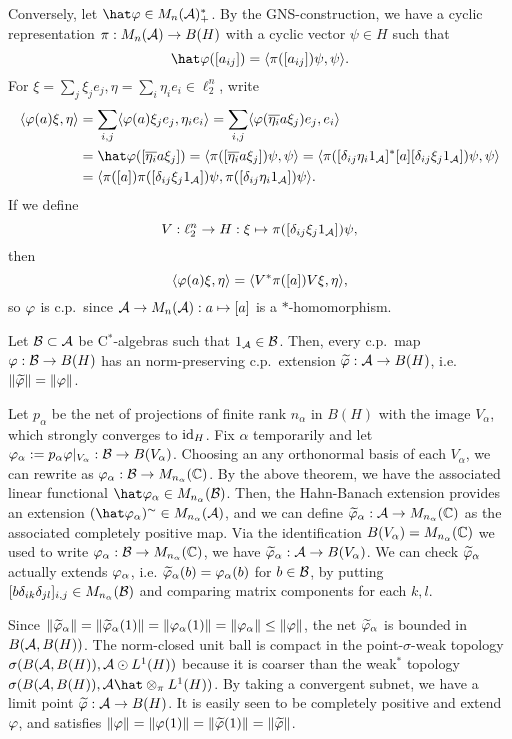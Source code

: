 \documentclass{../../small}
\begin{document}
\begin{pf}
Conversely, let $\hat\f\in M_n(\cA)^*_+$.
By the GNS-construction, we have a cyclic representation $\pi:M_n(\mathcal{A})\to B(H)$ with a cyclic vector $\psi\in H$ such that
\[\hat\f([a_{ij}])=\<\pi([a_{ij}])\psi,\psi\>.\]
For $\xi=\sum_j\xi_je_j,\eta=\sum_i\eta_ie_i\in\ell_2^n$, write
\begin{align*}
\<\f(a)\xi,\eta\>
&=\sum_{i,j}\<\f(a)\xi_je_j,\eta_ie_i\>
=\sum_{i,j}\<\f(\bar{\eta_i}a\xi_j)e_j,e_i\>\\
&=\hat\f([\bar{\eta_i}a\xi_j])
=\<\pi([\bar{\eta_i}a\xi_j])\psi,\psi\>
=\<\pi([\delta_{ij}\eta_i1_\cA]^*[a][\delta_{ij}\xi_j1_\cA])\psi,\psi\>\\
&=\<\pi([a])\pi([\delta_{ij}\xi_j1_\cA])\psi,\pi([\delta_{ij}\eta_i1_\cA])\psi\>.
\end{align*}
If we define
\[V:\ell_2^n\to H:\xi\mapsto\pi([\delta_{ij}\xi_j1_{\mathcal{A}}])\psi,\]
then
\[\langle\varphi(a)\xi,\eta\rangle=\langle V^*\pi([a])V\xi,\eta\rangle,\]
so $\varphi$ is c.p.~since $\mathcal{A}\to M_n(\mathcal{A}):a\mapsto[a]$ is a $*$-homomorphism.
\end{pf}

\begin{thm}
Let $\mathcal{B}\subset\mathcal{A}$ be C$^*$-algebras such that $1_{\mathcal{A}}\in\mathcal{B}$.
Then, every c.p.~map $\varphi:\mathcal{B}\to B(H)$ has an norm-preserving c.p.~extension $\widetilde{\varphi}:\mathcal{A}\to B(H)$, i.e. $\|\widetilde{\varphi}\|=\|\varphi\|$.
\end{thm}
\begin{pf}
Let $p_\alpha$ be the net of projections of finite rank $n_\alpha$ in $B(H)$ with the image $V_\alpha$, which strongly converges to $\operatorname{id}_H$.
Fix $\alpha$ temporarily and let $\varphi_\alpha:=p_\alpha\varphi|_{V_\alpha}:\mathcal{B}\to B(V_\alpha)$.
Choosing an any orthonormal basis of each $V_\alpha$, we can rewrite as $\varphi_\alpha:\mathcal{B}\to M_{n_\alpha}(\mathbb{C})$.
By the above theorem, we have the associated linear functional $\hat\f_\alpha\in M_{n_\alpha}(\cB)$.
Then, the Hahn-Banach extension provides an extension $(\hat\f_\alpha)^\sim\in M_{n_\alpha}(\cA)$, and we can define $\widetilde{\varphi}_\alpha:\mathcal{A}\to M_{n_\alpha}(\mathbb{C})$ as the associated completely positive map.
Via the identification $B(V_\alpha)=M_{n_\alpha}(\mathbb{C})$ we used to write $\varphi_\alpha:\mathcal{B}\to M_{n_\alpha}(\mathbb{C})$, we have $\widetilde{\varphi}_\alpha:\mathcal{A}\to B(V_\alpha)$.
We can check $\widetilde{\varphi}_\alpha$ actually extends $\varphi_\alpha$, i.e. $\widetilde{\varphi}_\alpha(b)=\varphi_\alpha(b)$ for $b\in\mathcal{B}$, by putting $[b\delta_{ik}\delta_{jl}]_{i,j}\in M_{n_\alpha}(\mathcal{B})$ and comparing matrix components for each $k,l$.

Since $\|\widetilde{\varphi}_\alpha\|=\|\widetilde{\varphi}_\alpha(1)\|=\|\varphi_\alpha(1)\|=\|\varphi_\alpha\|\le\|\varphi\|$, the net $\widetilde{\varphi}_\alpha$ is bounded in $B(\mathcal{A},B(H))$.
The norm-closed unit ball is compact in the point-$\sigma$-weak topology $\sigma(B(\mathcal{A},B(H)),\mathcal{A}\odot L^1(H))$ because it is coarser than the weak$^*$ topology $\sigma(B(\cA,B(H)),\cA\hat\otimes_\pi L^1(H))$.
By taking a convergent subnet, we have a limit point $\widetilde{\varphi}:\mathcal{A}\to B(H)$.
It is easily seen to be completely positive and extend $\varphi$, and satisfies $\|\varphi\|=\|\varphi(1)\|=\|\widetilde{\varphi}(1)\|=\|\widetilde{\varphi}\|$.
\end{pf}
\end{document}
